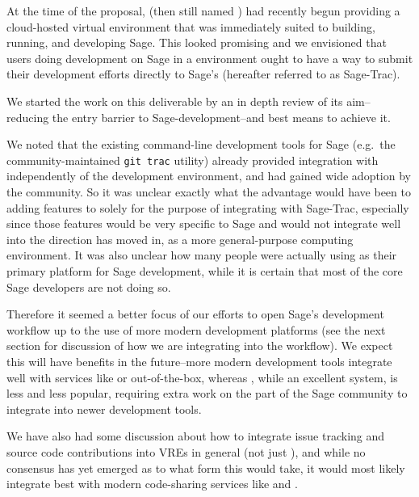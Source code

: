 At the time of the proposal, \cocalc (then still named \SMC) had recently begun
providing a cloud-hosted virtual environment that was immediately suited to
building, running, and developing Sage. This looked promising and we envisioned
that users doing development on Sage in a \cocalc environment ought to have a
way to submit their development efforts directly to Sage's \Trac (hereafter
referred to as Sage-Trac).

We started the work on this deliverable by an in depth review of its aim--
reducing the entry barrier to Sage-development--and best means to achieve it.

We noted that the existing command-line development tools for Sage (e.g.~the
community-maintained {\tt git trac} utility) already provided integration with
\Trac independently of the development environment, and had gained wide
adoption by the community. So it was unclear exactly what the advantage would
have been to adding features to \cocalc solely for the purpose of integrating
with Sage-Trac, especially since those features would be very specific to Sage
and would not integrate well into the direction \cocalc has moved in, as a more
general-purpose computing environment.  It was also unclear how many people
were actually using \cocalc as their primary platform for Sage development,
while it is certain that most of the core Sage developers are not doing so.


Therefore it seemed a better focus of our efforts to open Sage's development
workflow up to the use of more modern development platforms (see the next
section for discussion of how we are integrating \GitLab into the workflow).
We expect this will have benefits in the future--more modern development tools
integrate well with services like \GitHub or \GitLab out-of-the-box, whereas
\Trac, while an excellent system, is less and less popular, requiring extra
work on the part of the Sage community to integrate into newer development
tools.

We have also had some discussion about how to integrate issue tracking and
source code contributions into VREs in general (not just \cocalc), and while no
consensus has yet emerged as to what form this would take, it would most likely
integrate best with modern code-sharing services like \GitHub and \GitLab.


